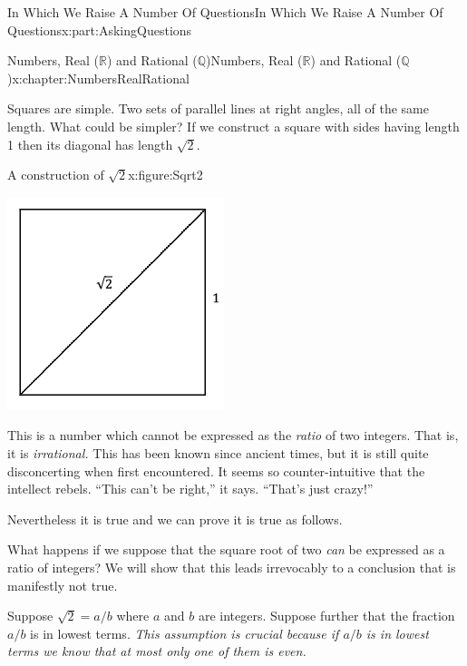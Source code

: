 \documentclass[oneside,10pt,]{book}
\numberwithin{equation}{section}
\newcommand{\RR}{\mathbb {R}}
\newcommand{\QQ}{\mathbb {Q}}
\begin{document}
\begin{partptx}{In Which We Raise A Number Of Questions}{}{In Which We Raise A Number Of Questions}{}{}{x:part:AskingQuestions}
\begin{chapterptx}{Numbers, Real (\(\RR\)) and Rational (\(\QQ\))}{}{Numbers, Real (\(\RR\)) and Rational (\(\QQ\))}{}{}{x:chapter:NumbersRealRational}
\begin{introduction}{}
\par
Squares are simple. Two sets of parallel lines at right angles, all of the same length. What could be simpler? If we construct a square with sides having length 1 then its diagonal has length \(\sqrt{2}\).%
\begin{figureptx}{A construction of \(\sqrt{2}\)}{x:figure:Sqrt2}{}%
\begin{image}{0.25}{0.5}{0.25}%
\includegraphics[width=\linewidth]{images/Sqrt2.png}
\end{image}%
\tcblower
\end{figureptx}%
 This is a number which cannot be expressed as the \emph{ratio} of two integers.  That is, it is \emph{irrational.} This has been known since ancient times, but it is still quite disconcerting when first encountered.  It seems so counter-intuitive that the intellect rebels.  ``This can't be right,'' it says. ``That's just crazy!''%
\par
Nevertheless it is true and we can prove it is true as follows.%
\par
What happens if we suppose that the square root of two \emph{can} be expressed as a ratio of integers? We will show that this leads irrevocably to a conclusion that is manifestly not true.%
\par
Suppose \(\sqrt{2}=a/b\) where \(a\) and \(b\) are integers. Suppose further that the fraction \(a/b\) is in lowest terms. \emph{This assumption is crucial because if \(a/b\) is in lowest terms we know that at most only one of them is even.}%

\end{introduction}
\end{chapterptx}
\end{partptx}
\end{document}
